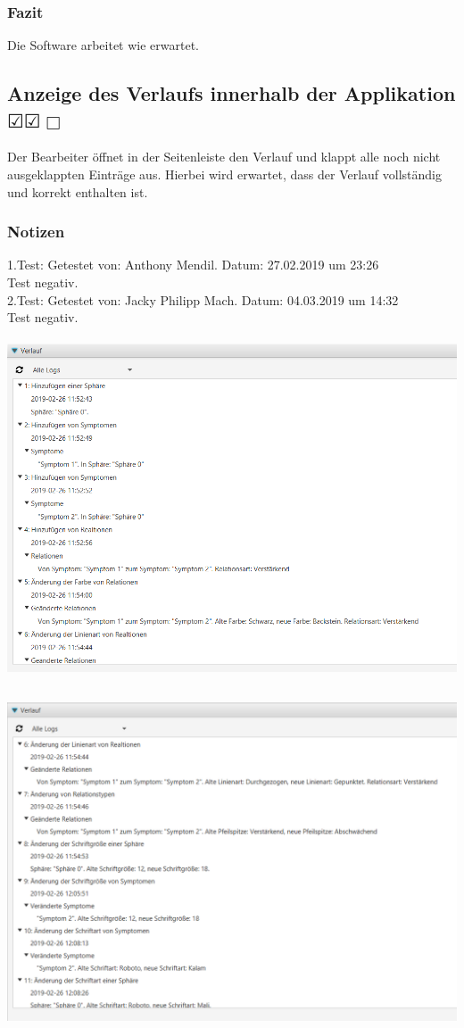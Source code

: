 \documentclass[enabledeprecatedfontcommands]{scrartcl}
\newcommand{\subsectiont}[2]{\subsection[#1]{#1{\normalsize\normalfont #2}}}
\newcommand{\leer}{$\Box$}
\newcommand{\ok}{$\CheckedBox$}
\begin{document}
\subsubsection{Fazit}
Die Software arbeitet wie erwartet.

\subsectiont{Anzeige des Verlaufs innerhalb der Applikation}{\dotfill\ok\ok\leer}
Der Bearbeiter öffnet in der Seitenleiste den Verlauf und klappt alle noch nicht ausgeklappten Einträge aus. Hierbei wird erwartet, dass der Verlauf vollständig und korrekt enthalten ist. 
\subsubsection{Notizen}
1.Test: Getestet von: Anthony Mendil. Datum: 27.02.2019 um 23:26 \\
Test negativ. \\
2.Test: Getestet von: Jacky Philipp Mach. Datum: 04.03.2019 um 14:32 \\
Test negativ.
\begin{center}
\includegraphics[height=10cm]{verlauf1.PNG}
\end{center}
\begin{center}
\includegraphics[height=10cm]{verlauf2.PNG}
\end{center}
\end{document}
